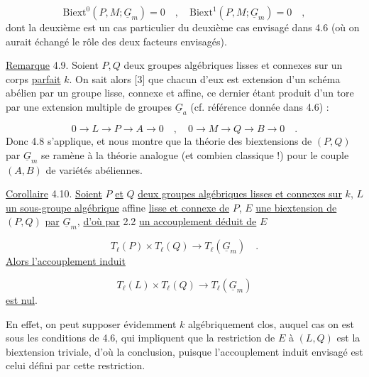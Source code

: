 \begin{equation*}
\mathrm{Biext}^0(P,M;\underline{G}_m) = 0 \quad , \quad \mathrm{Biext}^1(P,M;\underline{G}_m) = 0 \quad ,
\end{equation*}
dont la deuxième est un cas particulier du deuxième cas envisagé dans 4.6 (où on aurait échangé le rôle des deux facteurs envisagés).



\underline{Remarque} 4.9. Soient $P,Q$ deux groupes algébriques lisses et connexes sur un corps \underline{parfait} $k$. On sait alors [3] que chacun d'eux est extension d'un schéma abélien par un groupe lisse, connexe et affine, ce dernier étant produit d'un tore par une extension multiple de groupes $\underline{G}_a$ (cf. référence donnée dans 4.6) :

\begin{equation*}
0 \longrightarrow L \longrightarrow P \longrightarrow A \longrightarrow 0 \quad , \quad 0 \longrightarrow M \longrightarrow Q \longrightarrow B \longrightarrow 0 \quad .
\end{equation*}
Donc 4.8 s'applique, et nous montre que la théorie des biextensions de $(P,Q)$ par $\underline{G}_m$ se ramène à la théorie analogue (et combien classique !) pour le couple $(A,B)$ de variétés abéliennes.

\underline{Corollaire} 4.10. \underline{Soient} $P$ \underline{et} $Q$ \underline{deux groupes algébriques lisses et connexes sur} $k$, $L$ \underline{un sous-groupe algébrique} affine \underline{lisse et connexe de} $P$, $E$ \underline{une biextension de} $(P,Q)$ \underline{par} $\underline{G}_m$, \underline{d'où par} 2.2 \underline{un accouplement déduit de} $E$

\begin{equation*}
T_\ell(P) \times T_\ell(Q) \longrightarrow T_\ell(\underline{G}_m) \quad .
\end{equation*}
\underline{Alors l'accouplement induit}

\begin{equation*}
T_\ell(L) \times T_\ell(Q) \longrightarrow T_\ell(\underline{G}_m)
\end{equation*}
\underline{est nul}.

En effet, on peut supposer évidemment $k$ algébriquement clos, auquel cas on est sous les conditions de 4.6, qui impliquent que la restriction de $E$ à $(L,Q)$ est la biextension triviale, d'où la conclusion, puisque l'accouplement induit envisagé est celui défini par cette restriction.


